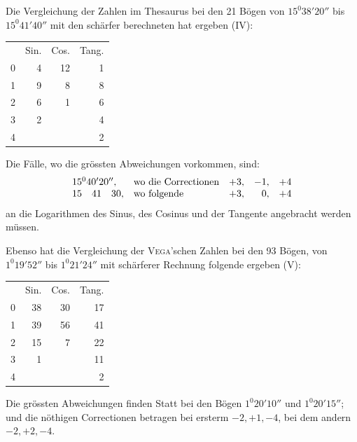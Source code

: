 \par
{}
Die Vergleichung der Zahlen im Thesaurus bei den 21 Bögen von $15^{0}38'20''$ bis $15^{0}41'40''$ mit den schärfer berechneten hat ergeben (IV):
\begin{center}\begin{tabular}{r r r r}
& Sin. & Cos. & Tang.\\
0&4&12&1\\
1&9&8&8\\
2&6&1&6\\
3&2&&4\\
4&&&2
\end{tabular}\end{center}
Die Fälle, wo die grössten Abweichungen vorkommen, sind:
\[
\begin{array}{l l r r r}
15^{0}40'20'',&\text{wo die Correctionen}&+3,&-1,&+4\\
15\quad41\quad30,&\text{wo folgende}&+3,&0,&+4
\end{array}
\]
an die Logarithmen des Sinus, des Cosinus und der Tangente angebracht werden müssen.

Ebenso hat die Vergleichung der \textsc{Vega}'schen Zahlen bei den 93 Bögen, von $1^{0}19'52''$ bis $1^{0}21'24''$ mit schärferer Rechnung folgende ergeben (V):
\begin{center}\begin{tabular}{r r r r}
& Sin. & Cos. & Tang.\\
0&38&30&17\\
1&39&56&41\\
2&15&7&22\\
3&1&&11\\
4&&&2
\end{tabular}\end{center}
Die grössten Abweichungen finden Statt bei den Bögen $1^{0}20'10''$ und $1^{0}20'15''$; und die nöthigen Correctionen betragen bei ersterm $-2,+1,-4$, bei dem andern $-2,+2,-4$.

